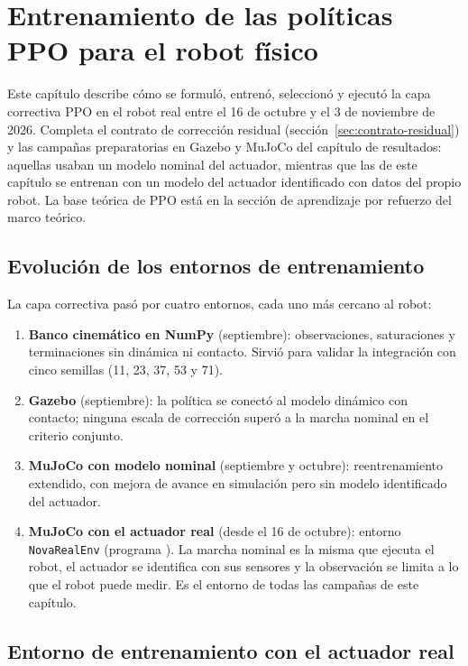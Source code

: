 \chapter{Entrenamiento de las políticas PPO para el robot físico}
\label{cap:ppo-fisico}

Este capítulo describe cómo se formuló, entrenó, seleccionó y ejecutó la capa
correctiva PPO en el robot real entre el 16 de octubre y el 3 de noviembre de 2026. Completa
el contrato de corrección residual (sección~\ref{sec:contrato-residual}) y las
campañas preparatorias en Gazebo y MuJoCo del capítulo de resultados: aquellas usaban un
modelo nominal del actuador, mientras que las de este capítulo se entrenan con
un modelo del actuador identificado con datos del propio robot. La base teórica
de PPO está en la sección de aprendizaje por refuerzo del marco teórico.

\section{Evolución de los entornos de entrenamiento}

La capa correctiva pasó por cuatro entornos, cada uno más cercano al robot:
\begin{enumerate}
    \item \textbf{Banco cinemático en NumPy} (septiembre): observaciones,
    saturaciones y terminaciones sin dinámica ni contacto. Sirvió para validar
    la integración con cinco semillas (11, 23, 37, 53 y 71).
    \item \textbf{Gazebo} (septiembre): la política se conectó al modelo
    dinámico con contacto; ninguna escala de corrección superó a la marcha
    nominal en el criterio conjunto.
    \item \textbf{MuJoCo con modelo nominal} (septiembre y octubre):
    reentrenamiento extendido, con mejora de avance en simulación pero sin
    modelo identificado del actuador.
    \item \textbf{MuJoCo con el actuador real} (desde el 16 de octubre): entorno
    \texttt{NovaRealEnv} (programa ).
    La marcha nominal es la misma que ejecuta el robot, el actuador se
    identifica con sus sensores y la observación se limita a lo que el robot
    puede medir. Es el entorno de todas las campañas de este capítulo.
\end{enumerate}

\section{Entorno de entrenamiento con el actuador real}

